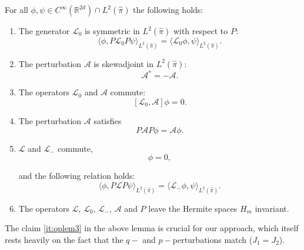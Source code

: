 \begin{lemma}
	\label{operator lemma}
	For all $\phi, \psi \in C^{\infty}(\mathbb{R}^{2d})\cap L^2(\widehat{\pi})$ the following holds:
	\begin{enumerate}[label=(\alph*)]
		\item \label{it:oplem1} The generator $\mathcal{L}_{0}$ is symmetric in $L^2(\widehat{\pi})$ with respect to $P$:
		\[
		\langle  \phi, P\mathcal{L}_{0}P \psi\rangle_{L^2(\widehat{\pi})}=\langle \mathcal{L}_{0} \phi, \psi \rangle_{L^2(\widehat{\pi})}.
		\]
		
		\item \label{it:oplem2} The perturbation $\mathcal{A}$ is skewadjoint in $L^{2}(\widehat{\pi})$:
		\[ 
		\mathcal{A}^{*} = -\mathcal{A}.
		\]
		
		\item \label{it:oplem3} The operators $\mathcal{L}_{0}$ and $\mathcal{A}$ commute:
		\[
		[\mathcal{L}_{0},\mathcal{A}]\phi=0.
		\]
		
		\item \label{it:oplem4} The perturbation $\mathcal{A}$ satisfies
		\[
		P\mathcal{A}P\phi=\mathcal{A}\phi.
		\]
		
		\item \label{it:oplem5} $\mathcal{L}$ and $\mathcal{L}_{-}$ commute,
		\begin{equation*}
		[\mathcal{L},\mathcal{L}_{-}]\phi = 0,
		\end{equation*}
		
		 and the following relation holds:
		\begin{equation}
		\langle \phi ,P\mathcal{L}P\psi\rangle_{L^{2}(\widehat{\pi})}=\langle\mathcal{L}_{-}\phi,\psi\rangle_{ L^{2}(\widehat{\pi})}.\label{eq:L+L-}
		\end{equation}
		\item \label{it:oplem6} 
		The operators $\mathcal{L}$, $\mathcal{L}_0$, $\mathcal{L}_{-}$, $\mathcal{A}$ and $P$ leave the Hermite spaces $H_m$ invariant.
	\end{enumerate}
\end{lemma}
\begin{remark}
	The claim \ref{it:oplem3} in the above lemma is crucial for our approach, which
	itself rests heavily on the fact that the $q-$ and $p-$perturbations
	match ($J_{1}=J_{2}$).
\end{remark}
